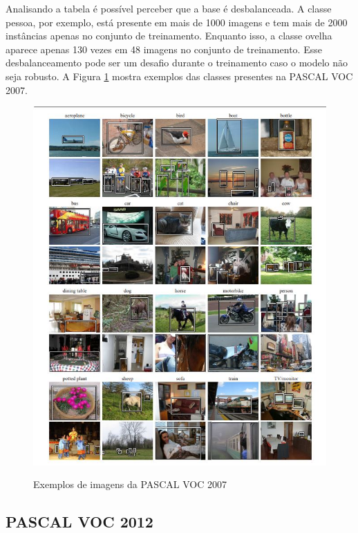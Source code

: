 Analisando a tabela é possível perceber que a base é desbalanceada. A classe pessoa, por exemplo, está presente em mais de 1000 imagens e tem mais de 2000 instâncias apenas no conjunto de treinamento. Enquanto isso, a classe ovelha aparece apenas 130 vezes em 48 imagens no conjunto de treinamento. Esse desbalanceamento pode ser um desafio durante o treinamento caso o modelo não seja robusto. A Figura \ref{fig:pascal2007} mostra exemplos das classes presentes na \ac{PASCAL VOC} 2007.

\begin{figure}[t]
	\setlength{\abovecaptionskip}{0pt}
	\setlength{\belowcaptionskip}{0pt}
	\caption[Imagens PASCAL VOC 2007]{Exemplos de imagens da PASCAL VOC 2007}
	\centering
	\includegraphics[width=.9\textwidth]{imagem/0x_pascal2007.jpg}
	\captionsetup{justification=centering}
	\label{fig:pascal2007}
\end{figure}

\subsection{PASCAL VOC 2012}
\label{section:3:4:1}

